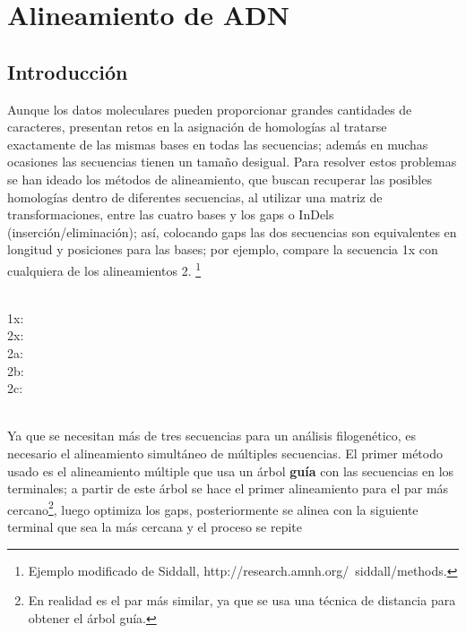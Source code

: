 \chapter{Alineamiento de ADN}
\section*{Introducci\'on}
\label{ch:alinear}
% 
% 
Aunque los datos moleculares pueden proporcionar grandes cantidades de caracteres, presentan retos 
en la asignaci\'on de homolog\'ias al tratarse exactamente de las mismas bases en todas las secuencias; adem\'as 
en muchas ocasiones las secuencias tienen un tama\~no desigual. 
Para resolver estos problemas se han ideado los m\'etodos de alineamiento, que buscan recuperar las posibles homolog\'ias 
dentro de diferentes secuencias, al utilizar una matriz de transformaciones, entre las cuatro bases y los gaps o 
InDels (inserci\'on/eliminaci\'on); as\'i, colocando gaps las dos secuencias son equivalentes en longitud y  posiciones
 para las bases; por ejemplo, compare la secuencia 1x con cualquiera de los alineamientos 2.
\footnote{Ejemplo modificado de Siddall, http://research.amnh.org/~siddall/methods.}\\
\\
\begin{small}
1x: \\
2x: \\
2a: \\
2b: \\
2c: \\
\end{small}
\\
Ya que se necesitan m\'as de tres secuencias para un an\'alisis filogen\'etico, es necesario el alineamiento simult\'aneo de 
m\'ultiples secuencias. El primer m\'etodo usado es el alineamiento m\'ultiple que usa un \'arbol \textbf{gu\'ia} con las 
secuencias en los terminales; a partir de este \'arbol se hace el primer alineamiento para el par m\'as 
cercano\footnote{En realidad es el par m\'as similar, ya que se usa una t\'ecnica de distancia para obtener el \'arbol gu\'ia.}, 
luego optimiza los gaps, posteriormente se alinea con la siguiente terminal que sea la m\'as cercana y el proceso se repite 
